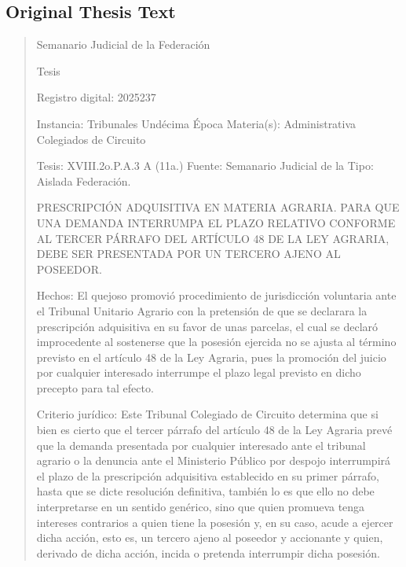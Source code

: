 \documentclass[11pt,a4paper]{article}
\begin{document}
\subsection{Original Thesis Text}

\begin{quote}
                                                   Semanario Judicial de la Federación

                                               Tesis

 Registro digital: 2025237

 Instancia: Tribunales             Undécima Época                        Materia(s): Administrativa
 Colegiados de Circuito

 Tesis: XVIII.2o.P.A.3 A (11a.)    Fuente: Semanario Judicial de la      Tipo: Aislada
                                   Federación.


PRESCRIPCIÓN ADQUISITIVA EN MATERIA AGRARIA. PARA QUE UNA DEMANDA
INTERRUMPA EL PLAZO RELATIVO CONFORME AL TERCER PÁRRAFO DEL ARTÍCULO 48
DE LA LEY AGRARIA, DEBE SER PRESENTADA POR UN TERCERO AJENO AL POSEEDOR.


Hechos: El quejoso promovió procedimiento de jurisdicción voluntaria ante el Tribunal Unitario
Agrario con la pretensión de que se declarara la prescripción adquisitiva en su favor de unas
parcelas, el cual se declaró improcedente al sostenerse que la posesión ejercida no se ajusta al
término previsto en el artículo 48 de la Ley Agraria, pues la promoción del juicio por cualquier
interesado interrumpe el plazo legal previsto en dicho precepto para tal efecto.

Criterio jurídico: Este Tribunal Colegiado de Circuito determina que si bien es cierto que el tercer
párrafo del artículo 48 de la Ley Agraria prevé que la demanda presentada por cualquier interesado
ante el tribunal agrario o la denuncia ante el Ministerio Público por despojo interrumpirá el plazo de
la prescripción adquisitiva establecido en su primer párrafo, hasta que se dicte resolución definitiva,
también lo es que ello no debe interpretarse en un sentido genérico, sino que quien promueva tenga
intereses contrarios a quien tiene la posesión y, en su caso, acude a ejercer dicha acción, esto es,
un tercero ajeno al poseedor y accionante y quien, derivado de dicha acción, incida o pretenda
interrumpir dicha posesión.


\end{quote}
\end{document}
